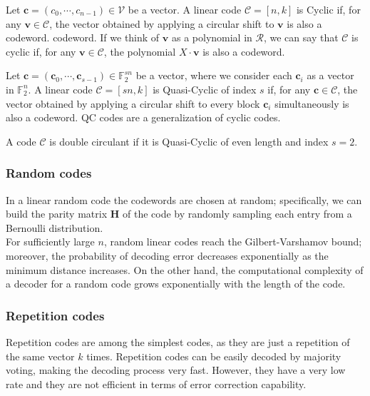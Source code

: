 \begin{definition}
    Let $\mathbf{c} = (c_0, \cdots, c_{n-1}) \in \mathcal{V}$ be a vector. A linear code $\mathcal{C} = [n, k]$ is Cyclic
    if, for any $\mathbf{v} \in \mathcal{C}$, the vector obtained by applying a circular shift to $\mathbf{v}$ is also a codeword.
    codeword. If we think of $\mathbf{v}$ as a polynomial in $\mathcal{R}$, we can say that $\mathcal{C}$ is cyclic if,
    for any $\mathbf{v} \in \mathcal{C}$, the polynomial $X \cdot \mathbf{v}$ is also a codeword.
\end{definition}

\begin{definition}
    Let $\mathbf{c} = (\mathbf{c}_0, \cdots, \mathbf{c}_{s-1}) \in \mathds{F}_2^{sn}$ be a vector, where we consider 
    each $\mathbf{c}_i$ as a vector in $\mathds{F}_2^n$.
    A linear code $\mathcal{C} = [sn,k]$ is Quasi-Cyclic of index $s$ if, for any $\mathbf{c} \in \mathcal{C}$, 
    the vector obtained by applying a circular shift to every block $\mathbf{c}_i$ simultaneously is also a codeword.
    QC codes are a generalization of cyclic codes.
\end{definition}

\begin{definition}
    A code $\mathcal{C}$ is double circulant if it is Quasi-Cyclic of even length and index $s=2$.
\end{definition}

\subsubsection{Random codes}
    In a linear random code the codewords are chosen at random; specifically, we can build the parity matrix $\mathbf{H}$ of
    the code by randomly sampling each entry from a Bernoulli distribution.\\
    For sufficiently large $n$, random linear codes reach the Gilbert-Varshamov bound; moreover, the probability of decoding
    error decreases exponentially as the minimum distance increases. On the other hand, the computational complexity of a decoder
    for a random code grows exponentially with the length of the code.

\subsubsection{Repetition codes}
    Repetition codes are among the simplest codes, as they are just a repetition of the same vector $k$ times.
    Repetition codes can be easily decoded by majority voting, making the decoding process very fast. However,
    they have a very low rate and they are not efficient in terms of error correction capability.

